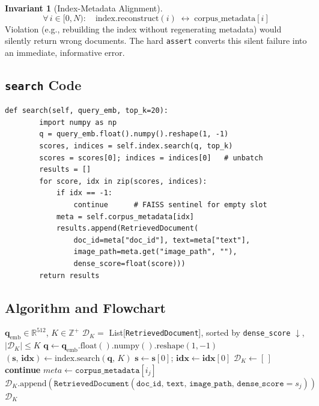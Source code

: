 \documentclass[12pt,a4paper]{article}
\theoremstyle{definition}
\newtheorem{invariant}[theorem]{Invariant}
\theoremstyle{remark}
\begin{document}
\begin{invariant}[Index-Metadata Alignment]
\[
  \forall\, i \in [0, N):\quad
  \text{index.reconstruct}(i) \;\longleftrightarrow\; \text{corpus\_metadata}[i]
\]
Violation (e.g., rebuilding the index without regenerating metadata)
would silently return wrong documents.
The hard \texttt{assert} converts this silent failure into an immediate,
informative error.
\end{invariant}

\subsection{\texttt{search} Code}

\begin{lstlisting}[caption={\texttt{FAISSDenseRetriever.search()}}]
    def search(self, query_emb, top_k=20):
        import numpy as np
        q = query_emb.float().numpy().reshape(1, -1)
        scores, indices = self.index.search(q, top_k)
        scores = scores[0]; indices = indices[0]   # unbatch
        results = []
        for score, idx in zip(scores, indices):
            if idx == -1:
                continue      # FAISS sentinel for empty slot
            meta = self.corpus_metadata[idx]
            results.append(RetrievedDocument(
                doc_id=meta["doc_id"], text=meta["text"],
                image_path=meta.get("image_path", ""),
                dense_score=float(score)))
        return results
\end{lstlisting}

\subsection{Algorithm and Flowchart}

\begin{algorithm}[H]
\caption{\texttt{FAISSDenseRetriever.search}($\mathbf{q}_{\text{emb}}$, $K$)}
\label{alg:faiss_search}
\begin{algorithmic}[1]
\Require $\mathbf{q}_{\text{emb}} \in \mathbb{R}^{512}$, $K \in \mathbb{Z}^+$
\Ensure $\mathcal{D}_K = $ List[\texttt{RetrievedDocument}], sorted by
        \texttt{dense\_score} $\downarrow$, $|\mathcal{D}_K| \leq K$
\State $\mathbf{q} \gets \mathbf{q}_{\text{emb}}.\text{float}().\text{numpy}().\text{reshape}(1, -1)$
\State $(\mathbf{s},\, \mathbf{idx}) \gets \text{index.search}(\mathbf{q},\, K)$
\State $\mathbf{s} \gets \mathbf{s}[0]$;\; $\mathbf{idx} \gets \mathbf{idx}[0]$
\State $\mathcal{D}_K \gets [\,]$
   \textbf{continue}
  \EndIf
  \State $\textit{meta} \gets \texttt{corpus\_metadata}[i_j]$
  \State $\mathcal{D}_K.\text{append}\!\left(\texttt{RetrievedDocument}(
         \texttt{doc\_id},\, \texttt{text},\, \texttt{image\_path},\,
         \texttt{dense\_score} = s_j)\right)$
\EndFor
\State \Return $\mathcal{D}_K$
\end{algorithmic}
\end{algorithm}
\end{document}
